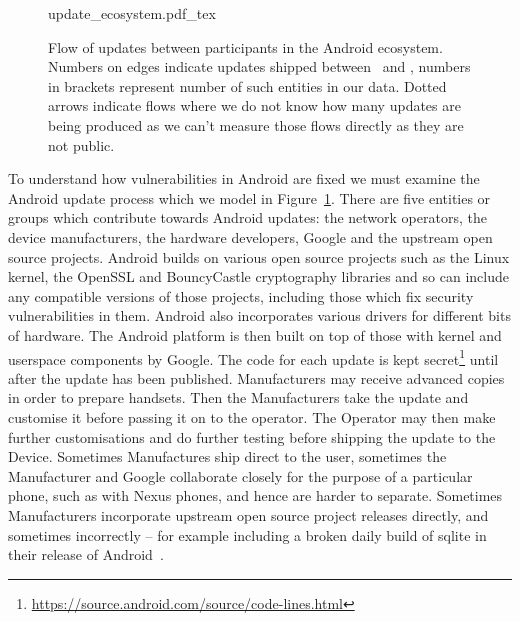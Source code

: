 \documentclass[conference,a4paper,twoside]{IEEEtran}
\let\OldTodo\todo
\renewcommand{\todo}{\OldTodo[inline]}
\newcommand{\todolater}[1]{}%
\begin{document}
\label{sec:android_update_process}
\begin{figure}
 \centering
 \def\svgwidth{\columnwidth}
 {update_ecosystem.pdf_tex}
 \caption{Flow of updates between participants in the Android ecosystem.
 Numbers on edges indicate updates shipped between \daStartDate\ and \daEndDate, numbers in brackets represent number of such entities in our data.
 Dotted arrows indicate flows where we do not know how many updates are being produced as we can't measure those flows directly as they are not public.\todolater{Turn into a sankey diagram}}
 \label{fig:update_ecosystem}
\end{figure}
To understand how vulnerabilities in Android are fixed we must examine the Android update process which we model in Figure~\ref{fig:update_ecosystem}.
There are five entities or groups which contribute towards Android updates: the network operators, the device manufacturers, the hardware developers, Google and the upstream open source projects.
Android builds on various open source projects such as the Linux kernel, the OpenSSL and BouncyCastle cryptography libraries and so can include any compatible versions of those projects, including those which fix security vulnerabilities in them.
Android also incorporates various drivers for different bits of hardware.
The Android platform is then built on top of those with kernel and userspace components by Google.
The code for each update is kept secret\footnote{\url{https://source.android.com/source/code-lines.html}}\todolater{Can we quantify this keeping the code secret? Is it worth it?} until after the update has been published.
Manufacturers may receive advanced copies in order to prepare handsets.
Then the Manufacturers take the update and customise it before passing it on to the operator.
The Operator may then make further customisations and do further testing before shipping the update to the Device.
Sometimes Manufactures ship direct to the user, sometimes the Manufacturer and Google collaborate closely for the purpose of a particular phone, such as with Nexus phones, and hence are harder to separate.
Sometimes Manufacturers incorporate upstream open source project releases directly, and sometimes incorrectly -- for example including a broken daily build of sqlite in their release of Android~\cite{Wagner2013}.
\todolater{use statistics from samsung-updates.com -> how many binaries are there per device?}
\end{document}
